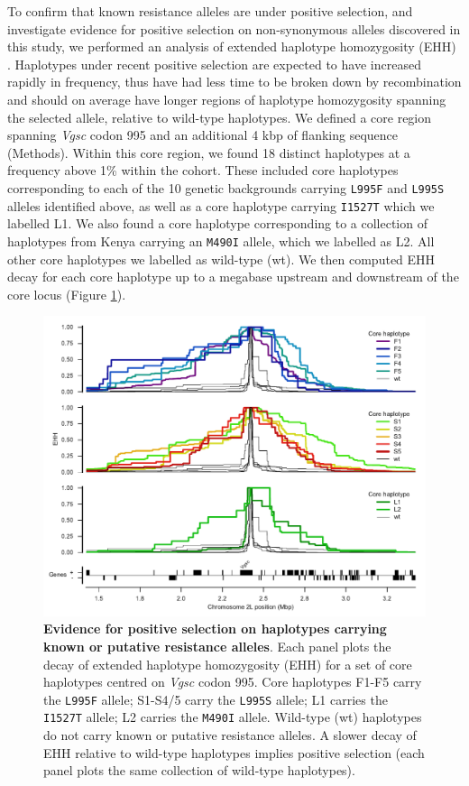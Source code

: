 \documentclass[a4paper,11pt,abstracton,hidelinks]{scrartcl}
\begin{document}
%
To confirm that known resistance alleles are under positive selection, and investigate evidence for positive selection on non-synonymous alleles discovered in this study, we performed an analysis of extended haplotype homozygosity (EHH) \cite{Sabeti2002}.
%
Haplotypes under recent positive selection are expected to have increased rapidly in frequency, thus have had less time to be broken down by recombination and should on average have longer regions of haplotype homozygosity spanning the selected allele, relative to wild-type haplotypes.
%
We defined a core region spanning \textit{Vgsc} codon 995 and an additional 4 kbp of flanking sequence (Methods).
%
Within this core region, we found 18 distinct haplotypes at a frequency above 1\% within the cohort.
%
These included core haplotypes corresponding to each of the 10 genetic backgrounds carrying \texttt{L995F} and \texttt{L995S} alleles identified above, as well as a core haplotype carrying \texttt{I1527T} which we labelled L1.
%
We also found a core haplotype corresponding to a collection of haplotypes from Kenya carrying an \texttt{M490I} allele, which we labelled as L2.
%
All other core haplotypes we labelled as wild-type (wt).
%
We then computed EHH decay for each core haplotype up to a megabase upstream and downstream of the core locus (Figure \ref{fig:ehh_decay}).
%


%
\begin{figure}[!t]
  \includegraphics[width=1.1\linewidth,center]{artwork/ehh_decay_old_clusters.pdf}
  \caption{\textbf{Evidence for positive selection on haplotypes carrying known or putative resistance alleles}. Each panel plots the decay of extended haplotype homozygosity (EHH) for a set of core haplotypes centred on \textit{Vgsc} codon 995. Core haplotypes F1-F5 carry the \texttt{L995F} allele; S1-S4/5 carry the \texttt{L995S} allele; L1 carries the \texttt{I1527T} allele; L2 carries the \texttt{M490I} allele. Wild-type (wt) haplotypes do not carry known or putative resistance alleles. A slower decay of EHH relative to wild-type haplotypes implies positive selection (each panel plots the same collection of wild-type haplotypes).}
  \label{fig:ehh_decay}
\end{figure}
\end{document}
